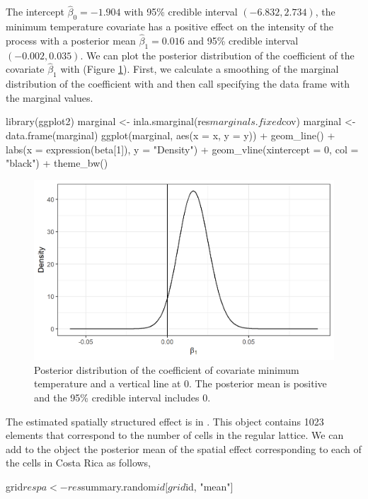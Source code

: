 The intercept $\hat \beta_0 = -1.904$ with 95\% credible interval $(-6.832, 2.734)$,
the minimum temperature covariate has a positive
effect on the intensity of the process with a posterior mean $\hat \beta_1 = 0.016$ and 95\% credible interval $(-0.002, 0.035)$.
We can plot the posterior distribution of the coefficient of the covariate $\hat \beta_1$ with  (Figure \ref{fig:ggplot2cov}).
First, we calculate a smoothing of the marginal distribution of the coefficient with  and then call  specifying the data frame with the marginal values.

\begin{example}
library(ggplot2)
marginal <- inla.smarginal(res$marginals.fixed$cov)
marginal <- data.frame(marginal)
ggplot(marginal, aes(x = x, y = y)) + geom_line() +
  labs(x = expression(beta[1]), y = "Density") +
  geom_vline(xintercept = 0, col = "black") + theme_bw()
\end{example}



\begin{figure}[htbp]
  \centering
  \includegraphics[width=.8\textwidth]{ggplot2cov2}
  \caption{Posterior distribution of the coefficient of covariate minimum temperature and a vertical line at 0. The posterior mean is positive and the 95\% credible interval includes 0.
}
  \label{fig:ggplot2cov}
\end{figure}



The estimated spatially structured effect is in
. This object contains 1023 elements that correspond to the number of cells in the regular lattice. We can add to the  object the posterior mean of the spatial effect corresponding to each of the cells in Costa Rica as follows,


\begin{example}
grid$respa <- res$summary.random$id[grid$id, "mean"]
\end{example}



